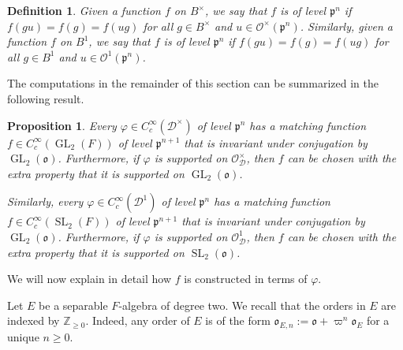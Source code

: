 \documentclass{article}
\newtheorem{prop}[lem]{Proposition}
\newtheorem{defi}[lem]{Definition}
\theoremstyle{named}
\newcommand{\D}{\mathcal{D}}
\renewcommand{\O}{\mathcal{O}}
\renewcommand{\o}{\mathfrak{o}}
\newcommand{\p}{\mathfrak{p}}
\DeclareMathOperator{\SL}{SL}
\DeclareMathOperator{\GL}{GL}
\begin{document}
\begin{defi}\label{defi:levelfunction}
Given a function $f$ on $B^\times$, we say that $f$ is of level $\p^n$ if $f(gu) = f(g) = f(ug)$ for all $g \in B^\times$ and $u \in \O^\times(\p^n)$. Similarly, given a function $f$ on $B^1$, we say that $f$ is of level $\p^n$ if $f(gu) = f(g) = f(ug)$ for all $g \in B^1$ and $u \in \O^1(\p^n)$. 
\end{defi}
The computations in the remainder of this section can be summarized in the following result.

\begin{prop}\label{prop:explicitmatching}
Every $\varphi \in C_c^\infty(\D^\times)$ of level $\p^n$ has a matching function $f \in C_c^\infty(\GL_2(F))$ of level $\p^{n+1}$ that is invariant under conjugation by $\GL_2(\o)$. Furthermore, if $\varphi$ is supported on $\O_\D^\times$, then $f$ can be chosen with the extra property that it is supported on $\GL_2(\o)$.

Similarly, every $\varphi \in C_c^\infty(\D^1)$ of level $\p^n$ has a matching function $f \in C_c^\infty(\SL_2(F))$ of level $\p^{n+1}$ that is invariant under conjugation by $\GL_2(\o)$. Furthermore, if $\varphi$ is supported on $\O_\D^1$, then $f$ can be chosen with the extra property that it is supported on $\SL_2(\o)$.
\end{prop}

We will now explain in detail how $f$ is constructed in terms of $\varphi$.

Let $E$ be a separable $F$-algebra of degree two. We recall that the orders in $E$ are indexed by $\mathbb{Z}_{\geq 0}$. Indeed, any order of $E$ is of the form $\o_{E, n} := \o + \varpi^n \o_E$ for a unique $n\geq 0$. 
\end{document}
